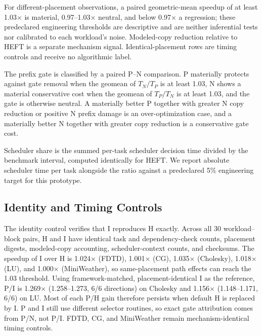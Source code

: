 \documentclass[sigconf]{acmart}
\begin{document}
For different-placement observations, a paired geometric-mean speedup of at least 1.03\(\times\) is material, 0.97--1.03\(\times\) neutral, and below 0.97\(\times\) a regression; these predeclared engineering thresholds are descriptive and are neither inferential tests nor calibrated to each workload's noise. Modeled-copy reduction relative to HEFT is a separate mechanism signal. Identical-placement rows are timing controls and receive no algorithmic label.

The prefix gate is classified by a paired P--N comparison. P materially protects against gate removal when the geomean of \(T_N/T_P\) is at least 1.03, N shows a material conservative cost when the geomean of \(T_P/T_N\) is at least 1.03, and the gate is otherwise neutral. A materially better P together with greater N copy reduction or positive N prefix damage is an over-optimization case, and a materially better N together with greater copy reduction is a conservative gate cost.

Scheduler share is the summed per-task scheduler decision time divided by the benchmark interval, computed identically for HEFT. We report absolute scheduler time per task alongside the ratio against a predeclared 5\% engineering target for this prototype.

\subsection{Identity and Timing Controls}\label{sec:identity-controls}

The identity control verifies that I reproduces H exactly. Across all 30 workload--block pairs, H and I have identical task and dependency-check counts, placement digests, modeled-copy accounting, scheduler-context counts, and checksums. The speedup of I over H is 1.024\(\times\) (FDTD), 1.001\(\times\) (CG), 1.035\(\times\) (Cholesky), 1.018\(\times\) (LU), and 1.000\(\times\) (MiniWeather), so same-placement path effects can reach the 1.03 threshold. Using framework-matched, placement-identical I as the reference, P/I is 1.269\(\times\) (1.258--1.273, 6/6 directions) on Cholesky and 1.156\(\times\) (1.148--1.171, 6/6) on LU. Most of each P/H gain therefore persists when default H is replaced by I. P and I still use different selector routines, so exact gate attribution comes from P/N, not P/I. FDTD, CG, and MiniWeather remain mechanism-identical timing controls.


\end{document}

